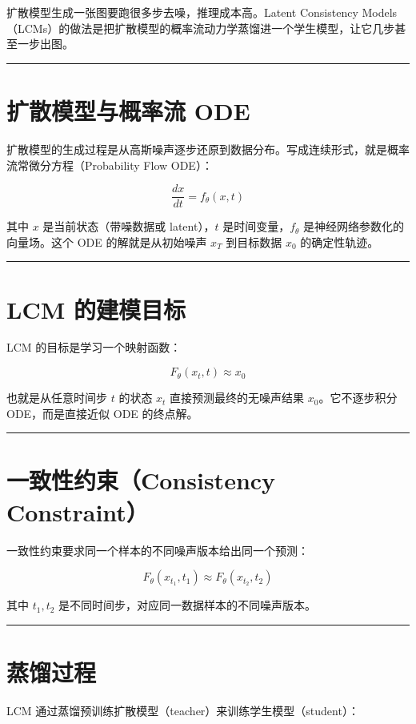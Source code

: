 扩散模型生成一张图要跑很多步去噪，推理成本高。Latent Consistency Models（LCMs）的做法是把扩散模型的概率流动力学蒸馏进一个学生模型，让它几步甚至一步出图。

\hrule

\section{扩散模型与概率流 ODE}

扩散模型的生成过程是从高斯噪声逐步还原到数据分布。写成连续形式，就是概率流常微分方程（Probability Flow ODE）：

\[
\frac{dx}{dt} = f_\theta(x, t)
\]

其中 \(x\) 是当前状态（带噪数据或 latent），\(t\) 是时间变量，\(f_\theta\) 是神经网络参数化的向量场。这个 ODE 的解就是从初始噪声 \(x_T\) 到目标数据 \(x_0\) 的确定性轨迹。

\hrule

\section{LCM 的建模目标}

LCM 的目标是学习一个映射函数：

\[
F_\theta(x_t, t) \approx x_0
\]

也就是从任意时间步 \(t\) 的状态 \(x_t\) 直接预测最终的无噪声结果 \(x_0\)。它不逐步积分 ODE，而是直接近似 ODE 的终点解。

\hrule

\section{一致性约束（Consistency Constraint）}

一致性约束要求同一个样本的不同噪声版本给出同一个预测：

\[
F_\theta(x_{t_1}, t_1) \approx F_\theta(x_{t_2}, t_2)
\]

其中 \(t_1, t_2\) 是不同时间步，对应同一数据样本的不同噪声版本。

\hrule

\section{蒸馏过程}

LCM 通过蒸馏预训练扩散模型（teacher）来训练学生模型（student）：

